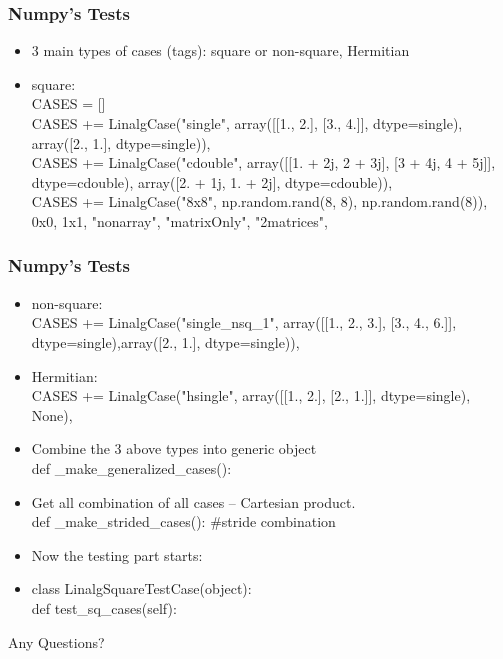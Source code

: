 \documentclass{beamer}
\begin{document}
\begin{frame}\frametitle{Numpy's Tests}
\begin{itemize}
\item 3 main types of cases (tags): square or non-square, Hermitian
\item square:
\\CASES = []
\\ CASES +=  LinalgCase("single", array([[1., 2.], [3., 4.]], dtype=single), array([2., 1.], dtype=single)),
\\ CASES +=   LinalgCase("cdouble", array([[1. + 2j, 2 + 3j], [3 + 4j, 4 + 5j]], dtype=cdouble), array([2. + 1j, 1. + 2j], dtype=cdouble)),
\\ CASES +=  LinalgCase("8x8", np.random.rand(8, 8), np.random.rand(8)),
\\  0x0, 1x1, "nonarray", "matrixOnly", "2matrices", 
\end{itemize}
\end{frame}

\begin{frame}\frametitle{Numpy's Tests}
\begin{itemize}
\item non-square: 
\\ CASES += LinalgCase("single\_nsq\_1", array([[1., 2., 3.], [3., 4., 6.]], dtype=single),array([2., 1.], dtype=single)),
\item Hermitian: 
\\CASES += LinalgCase("hsingle", array([[1., 2.], [2., 1.]], dtype=single), None),
\item Combine the 3 above types into generic object
\\def \_make\_generalized\_cases():
\item Get all combination of all cases – Cartesian product. 
\\def \_make\_strided\_cases(): #stride combination 
\item Now the testing part starts:
\item class LinalgSquareTestCase(object):
\\def test\_sq\_cases(self):
	\end{itemize}
\end{frame}




\begin{frame}
Any Questions?
\end{frame}
\end{document}
